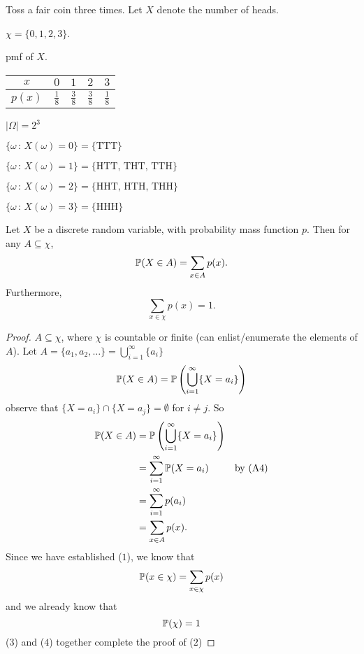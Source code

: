 \documentclass[10pt, a4paper]{article}
\begin{document}
\begin{example}[continues = exmp1]
    Toss a fair coin three times.
    Let $X$ denote the number of heads.

    $\chi = \{0, 1, 2, 3\}$.

    pmf of $X$.
    \begin{table}[h!]
        \begin{tabular}{c|cccc}
            $x$ & $0$ & $1$ & $2$ & $3$ \\
            \hline
            $p(x)$ & $\frac{1}{8}$ & $\frac{3}{8}$ & $\frac{3}{8}$ & $\frac{1}{8}$ \\
        \end{tabular}
    \end{table}

    $|\Omega| = 2 ^ 3$

    $\{\omega\,:\, X(\omega) = 0\} = \{\text{TTT}\}$
    
    $\{\omega\,:\, X(\omega) = 1\} = \{\text{HTT, THT, TTH}\}$
    
    $\{\omega\,:\, X(\omega) = 2\} = \{\text{HHT, HTH, THH}\}$
    
    $\{\omega\,:\, X(\omega) = 3\} = \{\text{HHH}\}$
\end{example}

\begin{theorem}
    Let $X$ be a discrete random variable,
    with probability mass function $p$.
    Then for any $A \subseteq \chi$,
    \begin{equation}
    \P(X \in A) = \sum_{x \in A}p(x).
    \end{equation}
    Furthermore,
    \begin{equation}
    \sum_{x \in \chi}p(x) = 1.
    \end{equation}
    \begin{proof}
        $A \subseteq \chi$,
        where $\chi$ is countable or finite (can enlist/enumerate the elements of $A$).
        Let $A = \{a_1, a_2, \dotsc\} = \bigcup_{i = 1}^{\infty}\{a_i\}$
        \[
        \P(X \in A) = \P\left(\bigcup_{i = 1}^\infty\{X = a_i\}\right)
        \]
        observe that $\{X = a_i\} \cap \{X = a_j\} = \emptyset$ for $i \neq j$.
        So
        \begin{align*}
        \P(X \in A) &= \P\left(\bigcup_{i = 1}^\infty\{X = a_i\}\right) \\
        &= \sum_{i = 1}^{\infty}\P(X = a_i) &\text{by (A4)} \\
        &= \sum_{i = 1}^{\infty}p(a_i) \\
        &= \sum_{x \in A}p(x).
        \end{align*}
        Since we have established ($1$),
        we know that
        \begin{equation}
        \P(x \in \chi) = \sum_{x \in \chi}p(x)
        \end{equation}
        and we already know that
        \begin{equation}
            \P(\chi) = 1
        \end{equation}
        ($3$) and ($4$) together complete the proof of ($2$)
        
    \end{proof}
\end{theorem}
\end{document}
